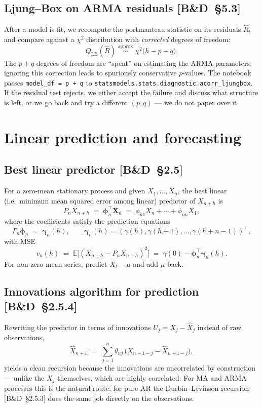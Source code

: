 \documentclass[11pt,a4paper]{article}
\newcommand{\E}{\mathbb{E}}
\newcommand{\BD}[1]{\textsc{[B\&D~§#1]}}
\begin{document}
\subsection*{Ljung--Box on ARMA residuals \BD{5.3}}
After a model is fit, we recompute the portmanteau statistic on its residuals
$\hat R_t$ and compare against a $\chi^2$ distribution with \emph{corrected}
degrees of freedom:
\begin{equation}
Q_{\mathrm{LB}}(\hat R)
\;\overset{\text{approx}}{\sim}\;
\chi^2\bigl(h - p - q\bigr).
\end{equation}
The $p + q$ degrees of freedom are ``spent'' on estimating the ARMA parameters;
ignoring this correction leads to spuriously conservative $p$-values. The
notebook passes \texttt{model\_df = p + q} to
\texttt{statsmodels.stats.diagnostic.acorr\_ljungbox}. If the residual test
rejects, we either accept the failure and discuss what structure is left, or
we go back and try a different $(p, q)$ --- we do not paper over it.

\section{Linear prediction and forecasting}

\subsection*{Best linear predictor \BD{2.5}}
For a zero-mean stationary process and given $X_1, \ldots, X_n$, the best linear
(i.e.\ minimum mean squared error among linear) predictor of $X_{n+h}$ is
\begin{equation}
P_n X_{n+h} \;=\; \boldsymbol\phi_n^\top \mathbf{X}_n
\;=\; \phi_{n1} X_n + \cdots + \phi_{nn} X_1,
\end{equation}
where the coefficients satisfy the prediction equations
\begin{equation}
\Gamma_n \boldsymbol\phi_n \;=\; \boldsymbol\gamma_n(h),
\qquad
\boldsymbol\gamma_n(h) = (\gamma(h), \gamma(h+1), \ldots, \gamma(h + n - 1))^\top,
\end{equation}
with MSE
\begin{equation}
v_n(h) \;=\; \E\bigl[(X_{n+h} - P_n X_{n+h})^2\bigr]
\;=\; \gamma(0) - \boldsymbol\phi_n^\top \boldsymbol\gamma_n(h).
\end{equation}
For non-zero-mean series, predict $X_t - \mu$ and add $\mu$ back.

\subsection*{Innovations algorithm for prediction \BD{2.5.4}}
Rewriting the predictor in terms of innovations
$U_j = X_j - \hat X_j$ instead of raw observations,
\begin{equation}
\hat X_{n+1}
\;=\;
\sum_{j=1}^{n} \theta_{nj}\,\bigl(X_{n+1-j} - \hat X_{n+1-j}\bigr),
\end{equation}
yields a clean recursion because the innovations are uncorrelated by
construction --- unlike the $X_j$ themselves, which are highly correlated.
For MA and ARMA processes this is the natural route; for pure AR the
Durbin--Levinson recursion \BD{2.5.3} does the same job directly on the
observations.
\end{document}
